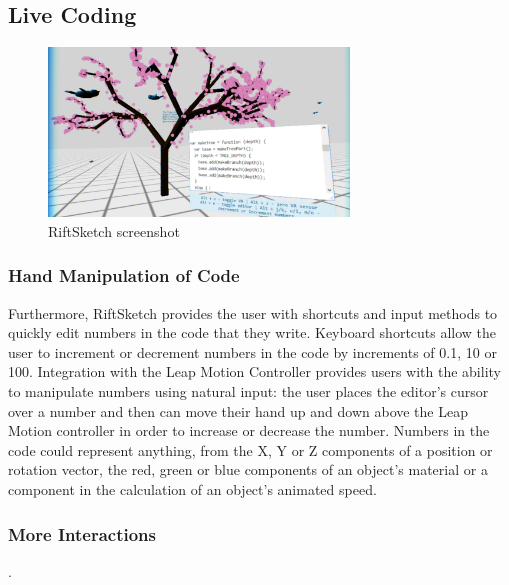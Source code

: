 \documentclass[conference]{IEEEtran}
\begin{document}

  
  

\subsection{Live Coding}

\begin{figure}[ht!]
\centering
\includegraphics[width=80mm]{figures/riftsketch/closer}
\caption{RiftSketch screenshot \label{riftsketch}}
\end{figure}

\subsubsection{Hand Manipulation of Code}

Furthermore, RiftSketch provides the user with shortcuts and input methods to quickly edit numbers in the code that they write. 
Keyboard shortcuts allow the user to increment or decrement numbers in the code by increments of 0.1, 10 or 100. 
Integration with the Leap Motion Controller provides users with the ability to manipulate numbers using natural input: the user places the editor's cursor over a number and then can move their hand up and down above the Leap Motion controller in order to increase or decrease the number. 
Numbers in the code could represent anything, from the X, Y or Z components of a position or rotation vector, the red, green or blue components of an object's material or a component in the calculation of an object's animated speed.

\subsubsection{More Interactions}.
\end{document}
